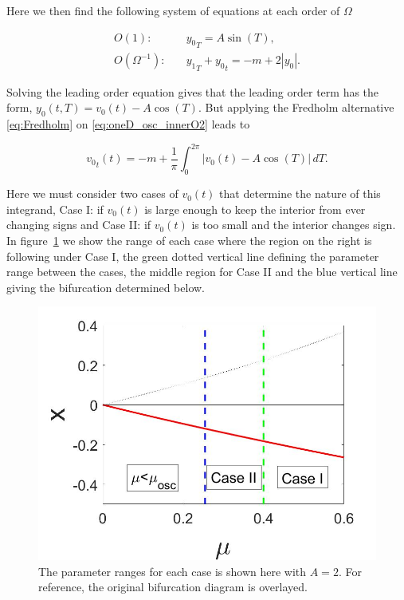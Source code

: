 Here we then find the following system of equations at each order of $\Omega$

\begin{align}
\label{eq:oneD_osc_innerO1}
O(1):\quad & {y_0}_T = A\sin(T),\\
\label{eq:oneD_osc_innerO2}
O(\Omega^{-1}):\quad & {y_1}_T+{y_0}_t = -m+2|y_0|.
\end{align}

Solving the leading order equation \label{eq:oneD_osc_innerO1} gives that the leading order term has the form, $y_0(t,T)=v_0(t)-A\cos(T)$. But applying the Fredholm alternative \eqref{eq:Fredholm} on \eqref{eq:oneD_osc_innerO2} leads to

\begin{equation}\label{eq:oneD_osc_integral}
{v_0}_t(t)=-m+\frac{1}{\pi}\int_0^{2\pi} |v_0(t)-A\cos(T)|\,dT.
\end{equation}

Here we must consider two cases of $v_0(t)$ that determine the nature of this integrand, Case I: if $v_0(t)$ is large enough to keep the interior from ever changing signs and Case II: if $v_0(t)$ is too small and the interior changes sign. In figure~\ref{fig:oneD_osc_cases} we show the range of each case where the region on the right is following under Case I, the green dotted vertical line defining the parameter range between the cases, the middle region for Case II and the blue vertical line giving the bifurcation determined below.

\begin{figure}[H]
\centering
\includegraphics[width=.7\textwidth]{oneD/osc_cases.jpg}
\caption{The parameter ranges for each case is shown here with $A=2$. For reference, the original bifurcation diagram is overlayed.}
\label{fig:oneD_osc_cases}
\end{figure}

